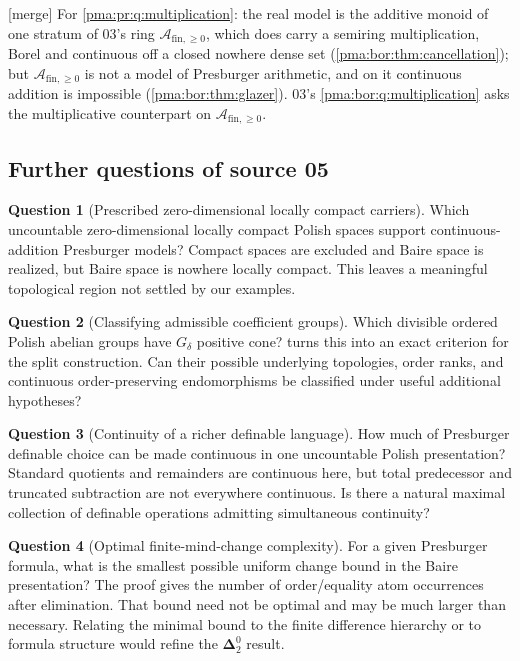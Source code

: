 \documentclass[11pt]{article}
\numberwithin{equation}{section}
\theoremstyle{definition}
\newtheorem{question}[question]{Question}
\theoremstyle{remark}
\newcommand{\Dtwo}{\boldsymbol{\Delta}^{0}_{2}}
\newcommand{\PP}{\mathcal A_{\mathrm{fin},\geq 0}}
\newcommand{\mergetag}{\textup{\textsf{\small[merge]}}}
\begin{document}
\noindent\mergetag{} For \cref{pma:pr:q:multiplication}: the real model is
the additive monoid of one stratum of 03's ring $\PP$, which does carry a
semiring multiplication, Borel and continuous off a closed nowhere dense set
(\cref{pma:bor:thm:cancellation}); but $\PP$ is not a model of Presburger
arithmetic, and on it continuous addition is impossible
(\cref{pma:bor:thm:glazer}). 03's \cref{pma:bor:q:multiplication} asks the
multiplicative counterpart on $\PP$.

\subsection{Further questions of source 05}\label{pma:pr:sec:q05}

\begin{question}[Prescribed zero-dimensional locally compact carriers]
Which uncountable zero-dimensional locally compact Polish spaces support
continuous-addition Presburger models? Compact spaces are excluded and
Baire space is realized, but Baire space is nowhere locally compact.
This leaves a meaningful topological region not settled by our examples.
\end{question}

\begin{question}[Classifying admissible coefficient groups]
Which divisible ordered Polish abelian groups have $G_\delta$ positive
cone?  turns this into an exact criterion for the
split construction. Can their possible underlying topologies, order
ranks, and continuous order-preserving endomorphisms be classified under
useful additional hypotheses?
\end{question}

\begin{question}[Continuity of a richer definable language]
How much of Presburger definable choice can be made continuous in one
uncountable Polish presentation? Standard quotients and remainders are
continuous here, but total predecessor and truncated subtraction are
not everywhere continuous. Is there a natural maximal collection of
definable operations admitting simultaneous continuity?
\end{question}

\begin{question}[Optimal finite-mind-change complexity]
For a given Presburger formula, what is the smallest possible uniform
change bound in the Baire presentation? The proof gives the number of
order/equality atom occurrences after elimination. That bound need not
be optimal and may be much larger than necessary. Relating the minimal
bound to the finite difference hierarchy or to formula structure would
refine the $\Dtwo$ result.
\end{question}
\end{document}
